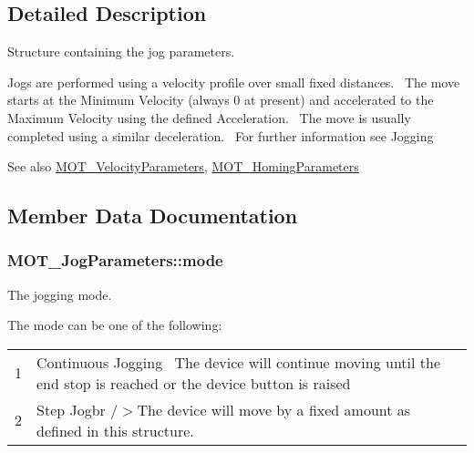 \subsection{Detailed Description}
Structure containing the jog parameters. 

Jogs are performed using a velocity profile over small fixed distances.~\newline
 The move starts at the Minimum Velocity (always 0 at present) and accelerated to the Maximum Velocity using the defined Acceleration.~\newline
 The move is usually completed using a similar deceleration.~\newline
 For further information see Jogging 

\begin{DoxySeeAlso}{See also}
\hyperlink{struct_m_o_t___velocity_parameters}{M\+O\+T\+\_\+\+Velocity\+Parameters}, \hyperlink{struct_m_o_t___homing_parameters}{M\+O\+T\+\_\+\+Homing\+Parameters}


\end{DoxySeeAlso}


\subsection{Member Data Documentation}
\subsubsection[{\texorpdfstring{mode}{mode}}]{ M\+O\+T\+\_\+\+Jog\+Parameters\+::mode}\hypertarget{struct_m_o_t___jog_parameters_aa15b08d3db3bc35613c84323e3d09c88}{}\label{struct_m_o_t___jog_parameters_aa15b08d3db3bc35613c84323e3d09c88}


The jogging mode. 

The mode can be one of the following\+: \tabulinesep=1mm
\begin{longtabu} spread 0pt [c]{*2{|X[-1]}|}
&Continuous Jogging~\newline
The device will continue moving until the end stop is reached or the device button is raised \\
2&Step Jogbr /$>$The device will move by a fixed amount as defined in this structure. \\
\end{longtabu}
